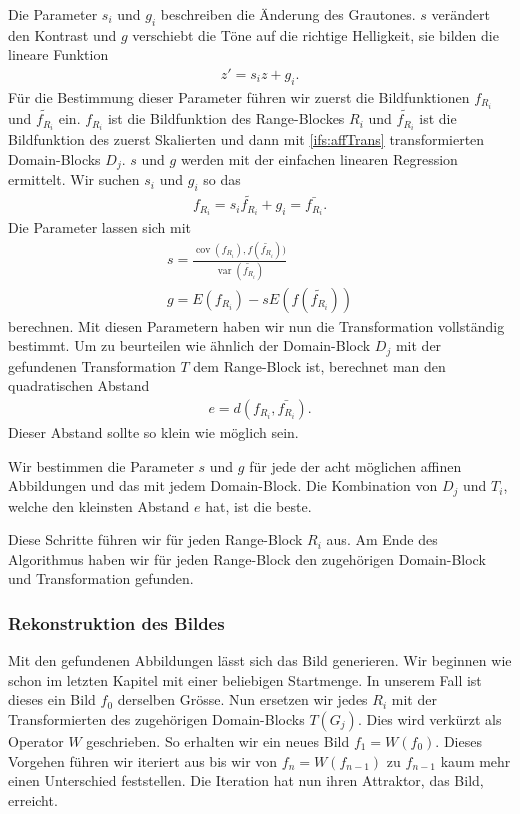 Die Parameter $s_i$ und $g_i$ beschreiben die Änderung des Grautones. $s$ verändert den Kontrast und $g$ verschiebt die Töne auf die richtige Helligkeit, sie bilden die lineare Funktion
\begin{align*}
	z' = s_i z + g_i.
\end{align*}
Für die Bestimmung dieser Parameter führen wir zuerst die Bildfunktionen $f_{R_i}$ und $\tilde{f_{R_i}}$ ein.
$f_{R_i}$ ist die Bildfunktion des Range-Blockes $R_i$ und $\tilde{f_{R_i}}$ ist die Bildfunktion des zuerst Skalierten und dann mit \ref{ifs:affTrans} transformierten Domain-Blocks $D_j$.
$s$ und $g$ werden mit der einfachen linearen Regression ermittelt. 
Wir suchen $s_i$ und $g_i$ so das
\begin{align*}
	f_{R_i} = s_i \tilde{f_{R_i}} + g_i = \bar{f_{R_i}}.
\end{align*}
Die Parameter lassen sich mit
\begin{align*}	
	s = \frac{\operatorname{cov}(f_{R_i}), f(\tilde{f_{R_i}}))}{\operatorname{var}(\tilde{f_{R_i}})} \\
	g = E(f_{R_i}) - s E(f(\tilde{f_{R_i}}))
\end{align*}
berechnen.
Mit diesen Parametern haben wir nun die Transformation vollständig bestimmt.
Um zu beurteilen wie ähnlich der Domain-Block $D_j$ mit der gefundenen Transformation $T$ dem Range-Block ist, berechnet man den quadratischen Abstand
\begin{align*}
	e = d(f_{R_i}, \bar{f_{R_i}}).
\end{align*}
Dieser Abstand sollte so klein wie möglich sein.

Wir bestimmen die Parameter $s$ und $g$ für jede der acht möglichen affinen Abbildungen und das mit jedem Domain-Block.
Die Kombination von $D_j$ und $T_i$, welche den kleinsten Abstand $e$ hat, ist die beste.

Diese Schritte führen wir für jeden Range-Block $R_i$ aus.
Am Ende des Algorithmus haben wir für jeden Range-Block den zugehörigen Domain-Block und Transformation gefunden.


\subsubsection{Rekonstruktion des Bildes}
Mit den gefundenen Abbildungen lässt sich das Bild generieren.
Wir beginnen wie schon im letzten Kapitel mit einer beliebigen Startmenge.
In unserem Fall ist dieses ein Bild  $f_0$ derselben Grösse.
Nun ersetzen wir jedes $R_i$ mit der Transformierten des zugehörigen Domain-Blocks $T(G_j)$.
Dies wird verkürzt als Operator $W$ geschrieben.
So erhalten wir ein neues Bild $f_1 = W(f_0)$.
Dieses Vorgehen führen wir iteriert aus bis wir von $f_n = W(f_{n-1})$ zu $f_{n-1}$ kaum mehr einen Unterschied feststellen. Die Iteration hat nun ihren Attraktor, das Bild, erreicht.

